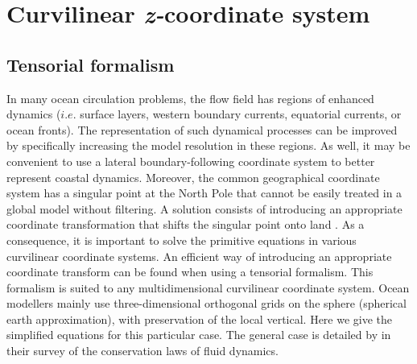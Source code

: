 \documentclass[../main/NEMO_manual]{subfiles}
\begin{document}
\section{Curvilinear \textit{z-}coordinate system}
\label{sec:PE_zco}


\subsection{Tensorial formalism}
\label{subsec:PE_tensorial}

In many ocean circulation problems, the flow field has regions of enhanced dynamics
($i.e.$ surface layers, western boundary currents, equatorial currents, or ocean fronts).
The representation of such dynamical processes can be improved by
specifically increasing the model resolution in these regions.
As well, it may be convenient to use a lateral boundary-following coordinate system to
better represent coastal dynamics.
Moreover, the common geographical coordinate system has a singular point at the North Pole that
cannot be easily treated in a global model without filtering.
A solution consists of introducing an appropriate coordinate transformation that
shifts the singular point onto land \citep{Madec_Imbard_CD96, Murray_JCP96}.
As a consequence, it is important to solve the primitive equations in various curvilinear coordinate systems.
An efficient way of introducing an appropriate coordinate transform can be found when using a tensorial formalism.
This formalism is suited to any multidimensional curvilinear coordinate system.
Ocean modellers mainly use three-dimensional orthogonal grids on the sphere (spherical earth approximation),
with preservation of the local vertical. Here we give the simplified equations for this particular case.
The general case is detailed by \citet{Eiseman1980} in their survey of the conservation laws of fluid dynamics.
\end{document}
